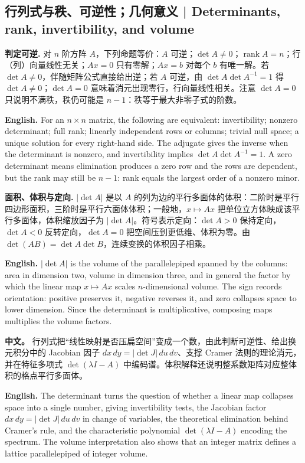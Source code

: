 \documentclass[UTF8,11pt,a4paper]{ctexart}
\newcommand{\EN}[1]{\par\noindent\textbf{English.} #1\par}
\newcommand{\APS}[2]{\par\noindent\textbf{中文。} #1\par\noindent\textbf{English.} #2\par\smallskip}
\begin{document}
\subsection{行列式与秩、可逆性；几何意义 | Determinants, rank, invertibility, and volume}
\noindent\textbf{判定可逆.} 对 $n$ 阶方阵 $A$，下列命题等价：$A$ 可逆；$\det A\ne0$；$\operatorname{rank}A=n$；行（列）向量线性无关；$Ax=0$ 只有零解；$Ax=b$ 对每个 $b$ 有唯一解。若 $\det A\ne0$，伴随矩阵公式直接给出逆；若 $A$ 可逆，由 $\det A\det A^{-1}=1$ 得 $\det A\ne0$；$\det A=0$ 意味着消元出现零行，行向量线性相关。注意 $\det A=0$ 只说明不满秩，秩仍可能是 $n-1$：秩等于最大非零子式的阶数。
\EN{For an $n\times n$ matrix, the following are equivalent: invertibility; nonzero determinant; full rank; linearly independent rows or columns; trivial null space; a unique solution for every right-hand side. The adjugate gives the inverse when the determinant is nonzero, and invertibility implies $\det A\det A^{-1}=1$. A zero determinant means elimination produces a zero row and the rows are dependent, but the rank may still be $n-1$: rank equals the largest order of a nonzero minor.}
\noindent\textbf{面积、体积与定向.} $|\det A|$ 是以 $A$ 的列为边的平行多面体的体积：二阶时是平行四边形面积，三阶时是平行六面体体积；一般地，$x\mapsto Ax$ 把单位立方体映成该平行多面体，体积缩放因子为 $|\det A|$。符号表示定向：$\det A>0$ 保持定向，$\det A<0$ 反转定向，$\det A=0$ 把空间压到更低维、体积为零。由 $\det(AB)=\det A\det B$，连续变换的体积因子相乘。
\EN{$|\det A|$ is the volume of the parallelepiped spanned by the columns: area in dimension two, volume in dimension three, and in general the factor by which the linear map $x\mapsto Ax$ scales $n$-dimensional volume. The sign records orientation: positive preserves it, negative reverses it, and zero collapses space to lower dimension. Since the determinant is multiplicative, composing maps multiplies the volume factors.}
\APS{行列式把“线性映射是否压扁空间”变成一个数，由此判断可逆性、给出换元积分中的 Jacobian 因子 $dx\,dy=|\det J|\,du\,dv$、支撑 Cramer 法则的理论消元，并在特征多项式 $\det(\lambda I-A)$ 中编码谱。体积解释还说明整系数矩阵对应整体积的格点平行多面体。}{The determinant turns the question of whether a linear map collapses space into a single number, giving invertibility tests, the Jacobian factor $dx\,dy=|\det J|\,du\,dv$ in change of variables, the theoretical elimination behind Cramer's rule, and the characteristic polynomial $\det(\lambda I-A)$ encoding the spectrum. The volume interpretation also shows that an integer matrix defines a lattice parallelepiped of integer volume.}
\end{document}

